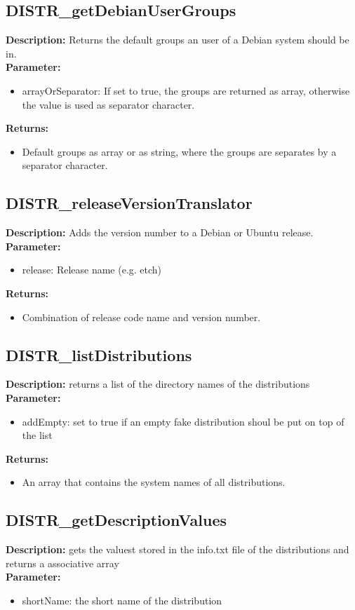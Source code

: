 \subsection{DISTR\_getDebianUserGroups}
\textbf{Description:} Returns the default groups an user of a Debian system should be in.\\
\textbf{Parameter:}
\begin{itemize}
\item arrayOrSeparator: If set to true, the groups are returned as array, otherwise the value is used as separator character.
\end{itemize}
\textbf{Returns:}
\begin{itemize}
\item Default groups as array or as string, where the groups are separates by a separator character.
\end{itemize}

\subsection{DISTR\_releaseVersionTranslator}
\textbf{Description:} Adds the version number to a Debian or Ubuntu release.\\
\textbf{Parameter:}
\begin{itemize}
\item release: Release name (e.g. etch)
\end{itemize}
\textbf{Returns:}
\begin{itemize}
\item Combination of release code name and version number.
\end{itemize}

\subsection{DISTR\_listDistributions}
\textbf{Description:} returns a list of the directory names of the distributions\\
\textbf{Parameter:}
\begin{itemize}
\item addEmpty: set to true if an empty fake distribution shoul be put on top of the list
\end{itemize}
\textbf{Returns:}
\begin{itemize}
\item An array that contains the system names of all distributions.
\end{itemize}

\subsection{DISTR\_getDescriptionValues}
\textbf{Description:} gets the valuest stored in the info.txt file of the distributions and returns a associative array\\
\textbf{Parameter:}
\begin{itemize}
\item shortName: the short name of the distribution
\end{itemize}

